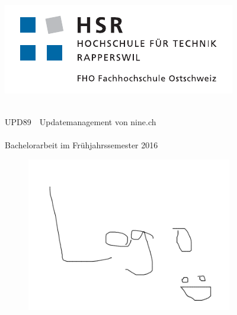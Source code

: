 
\author{
	\ubos \\
	\and
	\pchr \\
}

\clearpage
\begin{titlepage}
	\begin{minipage}{0.4\textwidth}
		\includegraphics[width=\textwidth]{fig/hsr-logo}
	\end{minipage}
	\hfill

	\begin{center}
		\hr{1pt} \\[0.2cm]
		\huge UPD89\ \textendash \ Updatemanagement von nine.ch \\
		\hr{1pt} \\[0.2cm]
		\Large{Bachelorarbeit im Frühjahrssemester 2016} \\ [25pt]
		\begin{figure}[H]
			\centering
			\includegraphics[width=0.8\textwidth]{fig/logo_upd89}
		\end{figure}
		\vfill
	\end{center}
	
	\begin{minipage}{\linewidth}
	

\end{minipage}
\end{titlepage}
